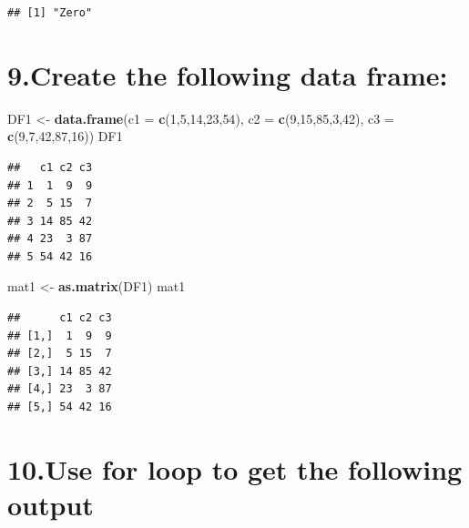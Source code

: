 \documentclass[]{article}
\newenvironment{Shaded}{\begin{snugshade}}{\end{snugshade}}
\newcommand{\DataTypeTok}[1]{\textcolor[rgb]{0.13,0.29,0.53}{#1}}
\newcommand{\DecValTok}[1]{\textcolor[rgb]{0.00,0.00,0.81}{#1}}
\newcommand{\KeywordTok}[1]{\textcolor[rgb]{0.13,0.29,0.53}{\textbf{#1}}}
\newcommand{\NormalTok}[1]{#1}
\newcommand{\StringTok}[1]{\textcolor[rgb]{0.31,0.60,0.02}{#1}}
\begin{document}
\begin{verbatim}
## [1] "Zero"
\end{verbatim}

\hypertarget{create-the-following-data-frame}{%
\section{9.Create the following data
frame:}\label{create-the-following-data-frame}}

\begin{Shaded}
\begin{Highlighting}[]
\NormalTok{DF1 <-}\StringTok{ }\KeywordTok{data.frame}\NormalTok{(}\DataTypeTok{c1 =} \KeywordTok{c}\NormalTok{(}\DecValTok{1}\NormalTok{,}\DecValTok{5}\NormalTok{,}\DecValTok{14}\NormalTok{,}\DecValTok{23}\NormalTok{,}\DecValTok{54}\NormalTok{), }
                  \DataTypeTok{c2 =} \KeywordTok{c}\NormalTok{(}\DecValTok{9}\NormalTok{,}\DecValTok{15}\NormalTok{,}\DecValTok{85}\NormalTok{,}\DecValTok{3}\NormalTok{,}\DecValTok{42}\NormalTok{), }
                  \DataTypeTok{c3 =} \KeywordTok{c}\NormalTok{(}\DecValTok{9}\NormalTok{,}\DecValTok{7}\NormalTok{,}\DecValTok{42}\NormalTok{,}\DecValTok{87}\NormalTok{,}\DecValTok{16}\NormalTok{))}
\NormalTok{DF1}
\end{Highlighting}
\end{Shaded}

\begin{verbatim}
##   c1 c2 c3
## 1  1  9  9
## 2  5 15  7
## 3 14 85 42
## 4 23  3 87
## 5 54 42 16
\end{verbatim}

\begin{Shaded}
\begin{Highlighting}[]
\NormalTok{mat1 <-}\StringTok{ }\KeywordTok{as.matrix}\NormalTok{(DF1)}
\NormalTok{mat1}
\end{Highlighting}
\end{Shaded}

\begin{verbatim}
##      c1 c2 c3
## [1,]  1  9  9
## [2,]  5 15  7
## [3,] 14 85 42
## [4,] 23  3 87
## [5,] 54 42 16
\end{verbatim}

\hypertarget{use-for-loop-to-get-the-following-output}{%
\section{10.Use for loop to get the following
output}\label{use-for-loop-to-get-the-following-output}}
\end{document}

